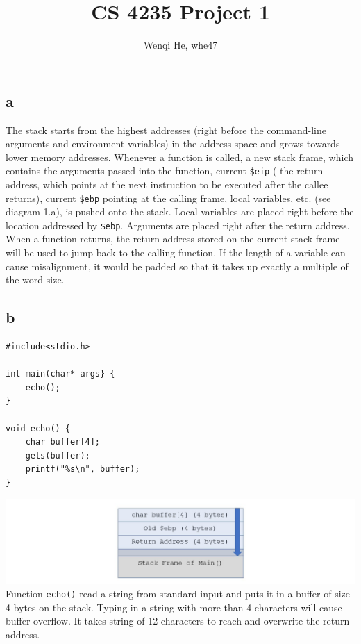 \documentclass{article}
\author{Wenqi He, whe47}
\title{CS 4235 Project 1}
\begin{document}
\maketitle
\section{}
\subsection*{a}
The stack starts from the highest addresses (right before the command-line arguments and environment variables) in the address space and grows towards lower memory addresses. Whenever a function is called, a new stack frame, which contains the arguments passed into the function, current \texttt{\$eip} ( the return address, which points at the next instruction to be executed after the callee returns), current \texttt{\$ebp} pointing at the calling frame,  local variables, etc. (see diagram 1.a), is pushed onto the stack. Local variables are placed right before the location addressed by \texttt{\$ebp}. Arguments are placed right after the return address. When a function returns, the return address stored on the current stack frame will be used to jump back to the calling function. If the length of a variable can cause misalignment, it would be padded so that it takes up exactly a multiple of the word size.
\subsection*{b}
\begin{verbatim}
#include<stdio.h>

int main(char* args} {
    echo();
}

void echo() {
    char buffer[4];
    gets(buffer);
    printf("%s\n", buffer);
}
\end{verbatim}
\includegraphics[width=\textwidth]{1b.jpg}\\
Function \texttt{echo()} read a string from standard input and puts it in a buffer of size 4 bytes on the stack. Typing in a string with more than 4 characters will cause buffer overflow. It takes string of 12 characters to reach and overwrite the return address.
\newpage
\end{document}
